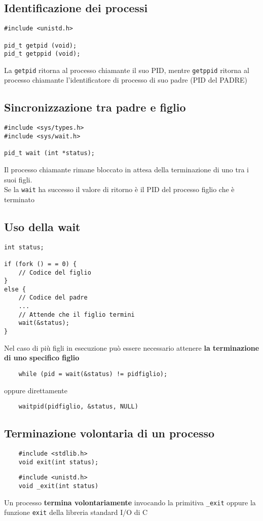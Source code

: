 \documentclass[italian,12pt,a4paper]{article}
\begin{document}
\subsection{Identificazione dei processi}
\begin{lstlisting}
#include <unistd.h>

pid_t getpid (void);
pid_t getppid (void);
\end{lstlisting}
La \verb|getpid| ritorna al processo chiamante il suo PID, mentre \verb|getppid| ritorna al processo chiamante l'identificatore di processo di suo padre (PID del PADRE)
\subsection{Sincronizzazione tra padre e figlio}
\begin{lstlisting}
#include <sys/types.h>
#include <sys/wait.h>

pid_t wait (int *status);
\end{lstlisting}
Il processo chiamante rimane bloccato in attesa della terminazione di uno tra i suoi figli.\\
Se la \verb|wait| ha successo il valore di ritorno è il PID del processo figlio che è terminato
\subsection{Uso della wait}
\begin{lstlisting}
int status;

if (fork () = = 0) {
	// Codice del figlio
}
else {
	// Codice del padre
	...
	// Attende che il figlio termini
	wait(&status);
}
\end{lstlisting}
Nel caso di più figli in esecuzione può essere necessario attenere \textbf{la terminazione di uno specifico figlio}
\begin{verbatim}
	while (pid = wait(&status) != pidfiglio);
\end{verbatim}
oppure direttamente
\begin{verbatim}
	waitpid(pidfiglio, &status, NULL)
\end{verbatim}
\subsection{Terminazione volontaria di un processo}
\begin{verbatim}
	#include <stdlib.h>
	void exit(int status);
\end{verbatim}
\begin{verbatim}
	#include <unistd.h>
	void _exit(int status)
\end{verbatim}
Un processo \textbf{termina volontariamente} invocando la primitiva \verb|_exit| oppure la funzione \verb|exit| della libreria standard I/O di C
\end{document}
